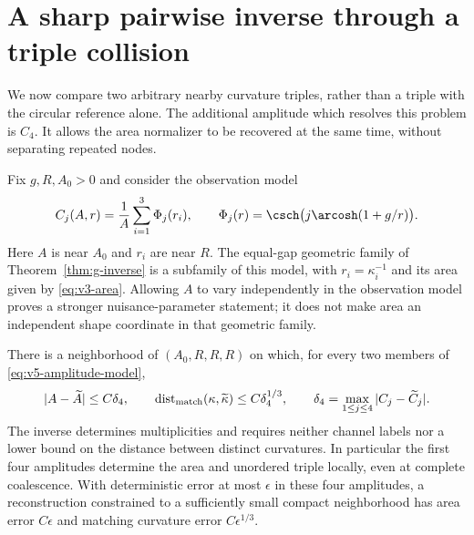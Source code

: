 \section{A sharp pairwise inverse through a triple collision}
\label{sec:v5-pairwise}
We now compare two arbitrary nearby curvature triples, rather than a
triple with the circular reference alone. The additional amplitude which
resolves this problem is $C_4$. It allows the area normalizer to be
recovered at the same time, without separating repeated nodes.

Fix $g,R,A_0>0$ and consider the observation model
\begin{equation}\label{eq:v5-amplitude-model}
 C_j(A,r)=\frac1A\sum_{i=1}^3\Phi_j(r_i),\qquad
 \Phi_j(r)=\csch\bigl(j\arcosh(1+g/r)\bigr).
\end{equation}
Here $A$ is near $A_0$ and $r_i$ are near $R$. The equal-gap geometric
family of Theorem~\ref{thm:g-inverse} is a subfamily of this model, with
$r_i=\kappa_i^{-1}$ and its area given by \eqref{eq:v3-area}. Allowing
$A$ to vary independently in the observation model proves a stronger
nuisance-parameter statement; it does not make area an independent
shape coordinate in that geometric family.

\begin{theorem}\label{thm:v5-pairwise}
There is a neighborhood of $(A_0,R,R,R)$ on which, for every two
members of \eqref{eq:v5-amplitude-model},
\begin{equation}\label{eq:v5-pairwise-bound}
 |A-\widetilde A|\le C\delta_4,\qquad
 \operatorname{dist}_{\rm match}(\kappa,\widetilde\kappa)
                         \le C\delta_4^{1/3},\qquad
 \delta_4=\max_{1\le j\le4}|C_j-\widetilde C_j|.
\end{equation}
The inverse determines multiplicities and requires neither channel
labels nor a lower bound on the distance between distinct curvatures.
In particular the first four amplitudes determine the area and unordered
triple locally, even at complete coalescence. With deterministic error
at most $\epsilon$ in these four amplitudes, a reconstruction constrained
to a sufficiently small compact neighborhood has area error $C\epsilon$
and matching curvature error $C\epsilon^{1/3}$.
\end{theorem}

